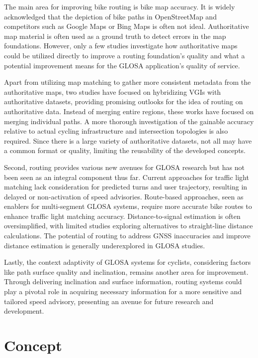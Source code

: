 \begin{Summary}
The main area for improving bike routing is bike map accuracy. It is widely acknowledged that the depiction of bike paths in OpenStreetMap and competitors such as Google Maps or Bing Maps is often not ideal. Authoritative map material is often used as a ground truth to detect errors in the map foundations. However, only a few studies investigate how authoritative maps could be utilized directly to improve a routing foundation's quality and what a potential improvement means for the GLOSA application's quality of service.

Apart from utilizing map matching to gather more consistent metadata from the authoritative maps, two studies have focused on hybridizing VGIs with authoritative datasets, providing promising outlooks for the idea of routing on authoritative data. Instead of merging entire regions, these works have focused on merging individual paths. A more thorough investigation of the gainable accuracy relative to actual cycling infrastructure and intersection topologies is also required. Since there is a large variety of authoritative datasets, not all may have a common format or quality, limiting the reusability of the developed concepts.

Second, routing provides various new avenues for GLOSA research but has not been seen as an integral component thus far. Current approaches for traffic light matching lack consideration for predicted turns and user trajectory, resulting in delayed or non-activation of speed advisories. Route-based approaches, seen as enablers for multi-segment GLOSA systems, require more accurate bike routes to enhance traffic light matching accuracy. Distance-to-signal estimation is often oversimplified, with limited studies exploring alternatives to straight-line distance calculations. The potential of routing to address GNSS inaccuracies and improve distance estimation is generally underexplored in GLOSA studies. 

Lastly, the context adaptivity of GLOSA systems for cyclists, considering factors like path surface quality and inclination, remains another area for improvement. Through delivering inclination and surface information, routing systems could play a pivotal role in acquiring necessary information for a more sensitive and tailored speed advisory, presenting an avenue for future research and development.
\end{Summary}

\section{Concept}

